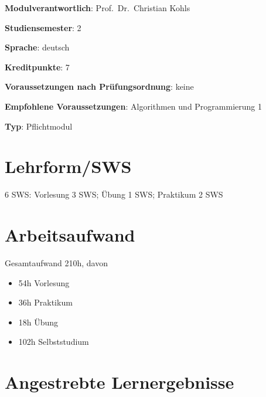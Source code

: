 \begin{modulHead}
\textbf{Modulverantwortlich}: Prof.~Dr.~Christian
Kohls
\end{modulHead}
\begin{modulHead}
\textbf{Studiensemester}:
2
\end{modulHead}
\begin{modulHead}
\textbf{Sprache}:
deutsch
\end{modulHead}
\begin{modulHead}
\textbf{Kreditpunkte}:
7
\end{modulHead}
\begin{modulHead}
\textbf{Voraussetzungen nach
Prüfungsordnung}:
keine
\end{modulHead}
\begin{modulHead}
\textbf{Empfohlene
Voraussetzungen}: Algorithmen und Programmierung
1
\end{modulHead}
\begin{modulHead}
\textbf{Typ}:
Pflichtmodul
\end{modulHead}


\section*{Lehrform/SWS\label{/mi-2017/modulbeschreibungen-bachelor/BA_AlgorithmenundProgrammierung2}}\label{lehrformswspathlabelmi-2017modulbeschreibungen-bachelorbaux5falgorithmenundprogrammierung2}

6 SWS: Vorlesung 3 SWS; Übung 1 SWS; Praktikum 2 SWS

\section*{Arbeitsaufwand\label{/mi-2017/modulbeschreibungen-bachelor/BA_AlgorithmenundProgrammierung2}}\label{arbeitsaufwandpathlabelmi-2017modulbeschreibungen-bachelorbaux5falgorithmenundprogrammierung2}

Gesamtaufwand 210h, davon

\begin{itemize}
\tightlist
\item
  54h Vorlesung
\item
  36h Praktikum
\item
  18h Übung
\item
  102h Selbststudium
\end{itemize}

\section*{Angestrebte
Lernergebnisse\label{/mi-2017/modulbeschreibungen-bachelor/BA_AlgorithmenundProgrammierung2}}\label{angestrebte-lernergebnissepathlabelmi-2017modulbeschreibungen-bachelorbaux5falgorithmenundprogrammierung2}

